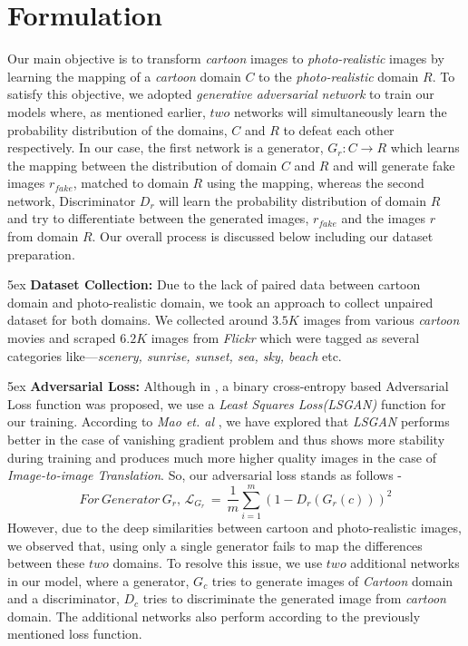 \documentclass[runningheads]{llncs}
\begin{document}
\section{Formulation} \label{sec:formula}
Our main objective is to transform \textit{cartoon} images to \textit{photo-realistic} images by learning the mapping of a \textit{cartoon} domain $C$ to the \textit{photo-realistic} domain $R$. To satisfy this objective, we adopted \textit{generative adversarial network}\cite{DBLP:conf/nips/GoodfellowPMXWOCB14} to train our models where, as mentioned earlier, $two$ networks will simultaneously learn the probability distribution of the domains, $C$ and $R$ to defeat each other respectively. In our case, the first network is a generator, $G_r: C\rightarrow R$ which learns the mapping between the distribution of domain $C$ and $R$ and will generate fake images $r_{fake}$, matched to domain $R$ using the mapping, whereas the second network,  Discriminator $D_r$ will learn the probability distribution of domain $R$ and try to differentiate between the generated images, $r_{fake}$ and the images $r$ from domain $R$. Our overall process is discussed below including our dataset preparation.

\parindent 5ex \textbf{Dataset Collection:} Due to the lack of paired data between {cartoon} domain and {photo-realistic} domain, we took an approach to collect unpaired dataset for both domains. We collected around $3.5K$ images from various \textit{cartoon} movies and scraped $6.2K$ images from \textit{Flickr} which were tagged as several categories like---\textit{scenery, sunrise, sunset, sea, sky, beach} etc. 

\parindent 5ex \textbf{Adversarial Loss:} Although in
\cite{DBLP:conf/nips/GoodfellowPMXWOCB14}, a binary cross-entropy based Adversarial Loss function was proposed, we use a \textit{Least Squares Loss(LSGAN)} function for our training. According to \textit{Mao et. al} \cite{DBLP:conf/iccv/MaoLXLWS17}, we have explored that \textit{LSGAN} performs better in the case of vanishing gradient problem and thus shows more stability during training and produces much more higher quality images in the case of \textit{Image-to-image Translation}. So, our adversarial loss stands as follows - 
\begin{equation}
For\, Generator\, G_r,\, \mathcal{L}_{G_r}\, =\, \frac{1}{m}\sum^m_{i=1}(1-D_r(G_r(c)))^2
\end{equation}  
However, due to the deep similarities between cartoon and photo-realistic images, we observed that, using only a single generator fails to map the differences between these $two$ domains. To resolve this issue, we use $two$ additional networks in our model, where a generator, $G_c$ tries to generate images of \textit{Cartoon} domain and a discriminator, $D_c$ tries to discriminate the generated image from \textit{cartoon} domain. The additional networks also perform according to the previously mentioned loss function.\\ %
\end{document}
